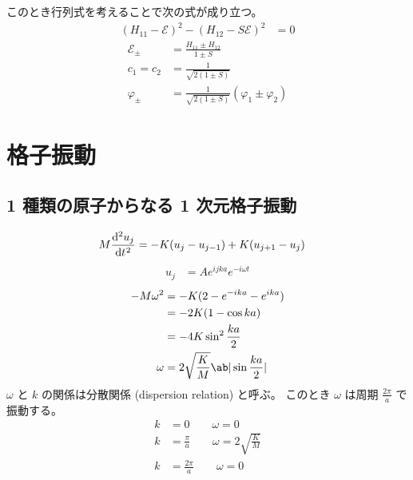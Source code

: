 \documentclass[uplatex,dvipdfmx,a4paper,11pt]{jlreq}
\numberwithin{equation}{section}
\theoremstyle{definition}
\begin{document}
このとき行列式を考えることで次の式が成り立つ。
\begin{align}
  (H_{11} - \mathcal{E})^2 - (H_{12} - S\mathcal{E})^2 & = 0
\end{align}
\begin{align}
  \mathcal{E}_\pm & = \frac{H_{11} \pm H_{12}}{1 \pm S}                    \\
  c_1 = c_2       & = \frac{1}{\sqrt{2(1 \pm S)}}                          \\
  \varphi_\pm     & = \frac{1}{\sqrt{2(1 \pm S)}}(\varphi_1 \pm \varphi_2)
\end{align}

\section{格子振動}
\subsection{1 種類の原子からなる 1 次元格子振動}
\begin{align}
  M\diff[2]{u_j}{t} & = -K(u_j - u_{j-1}) + K(u_{j+1} - u_j)
\end{align}
\begin{align}
  u_j & = Ae^{ijka}e^{-i\omega t}
\end{align}
\begin{align}
  -M\omega^2 & = -K(2 - e^{-ika} - e^{ika})               \\
             & = -2K(1 - \cos ka)                         \\
             & = -4K\sin^2\frac{ka}{2}                    \\
  \omega     & = 2\sqrt{\frac{K}{M}}\ab|\sin\frac{ka}{2}|
\end{align}
$\omega$ と $k$ の関係は分散関係 (dispersion relation) と呼ぶ。
このとき $\omega$ は周期 $\frac{2\pi}{a}$ で振動する。
\begin{align}
  k & = 0 \qquad \omega = 0                               \\
  k & = \frac{\pi}{a} \qquad \omega = 2\sqrt{\frac{K}{M}} \\
  k & = \frac{2\pi}{a} \qquad \omega = 0
\end{align}
\end{document}
